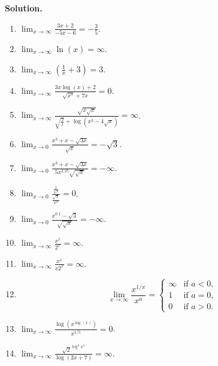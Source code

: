 \documentclass[9pt]{article}
\newcommand{\D}{\displaystyle}
\begin{document}
\begin{enumerate}
      \textbf{Solution.}

      \begin{enumerate}
         \item $\D\lim_{x \rightarrow \infty} \frac{3x + 2}{-5x - 6} =
                -\frac{3}{5}$.
         \item $\D\lim_{x \rightarrow \infty} \ln(x) = \infty$.
         \item $\D\lim_{x \rightarrow \infty} \left(\frac{1}{x} + 3\right) = 3$.
         \item $\D\lim_{x \rightarrow \infty}
                  \frac{3x\log(x)+ 2}{\sqrt{x^3} + 7x} = 0$.
         \item $\D\lim_{x \rightarrow \infty}
                  \frac{\sqrt{x\sqrt{x}}}{\sqrt{\D\frac{2}{x}} +
                  \log(x^3 - 4\sqrt{x})} = \infty$.
         \item $\D\lim_{x \rightarrow 0}
                \frac{x^3 + x - \sqrt{3x}}{\sqrt{x}} = -\sqrt{3}$.
         \item $\D\lim_{x \rightarrow 0}
                \frac{x^3 + x - \sqrt{3x}}{5x^{2.25}\sqrt{\sqrt{x}}} = -\infty$.
         \item $\D\lim_{x \rightarrow 0}
                \frac{\D\frac{1}{x^3}}{\D\frac{\sqrt{x}}{x^4}} = 0$.
         \item $\D\lim_{x \rightarrow 0}
                \frac{x^{0.1} - \sqrt{3}}{\sqrt{\sqrt{x}}} = -\infty$.
         \item $\D\lim_{x \rightarrow \infty}\frac{x^x}{2^x} = \infty$.
         \item $\D\lim_{x \rightarrow \infty}\frac{x^x}{x2^x} = \infty$.
         \item \begin{equation*}
                  \D\lim_{x \rightarrow \infty}\frac{x^{1/x}}{x^a} = \left\{
                     \begin{array}{cl}
                        \infty & \text{if } a < 0,\\
                        1      & \text{if } a = 0,\\
                        0      & \text{if } a > 0.
                     \end{array} \right.
               \end{equation*}
         \item $\D\lim_{x \rightarrow \infty}
                  \frac{\log(x^{\log(x)})}{x^{1/5}} = 0$.
         \item $\D\lim_{x \rightarrow \infty}
                   \frac{\sqrt{2}^{\log^4x^3}}{\log(2x+7)} = \infty$.

\end{enumerate}
\end{enumerate}
\end{document}
